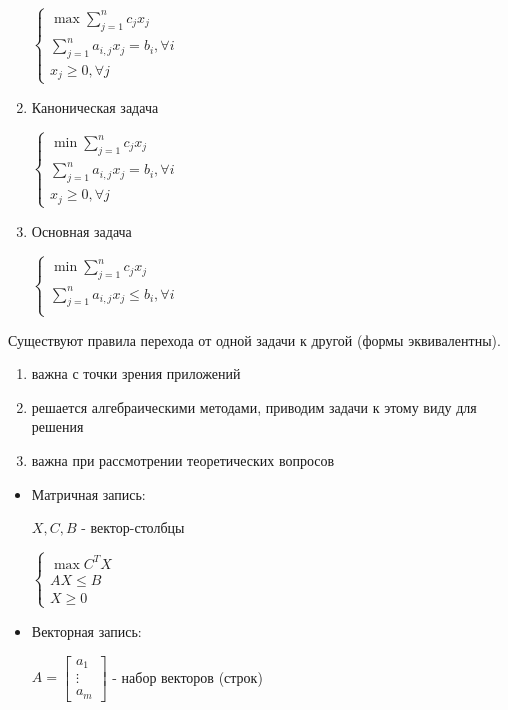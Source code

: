 \documentclass[11pt]{article}
\theoremstyle{break}
\begin{document}
\begin{sloppypar}
\begin{enumerate}
    $\begin{cases}
      \max \sum_{j = 1}^n c_j x_j \\
      \sum_{j = 1}^n a_{i, j} x_j = b_i, \forall i \\
      x_j \geq 0, \forall j
    \end{cases}$
  \item Каноническая задача
  
    $\begin{cases}
      \min \sum_{j = 1}^n c_j x_j \\
      \sum_{j = 1}^n a_{i, j} x_j = b_i, \forall i \\
      x_j \geq 0, \forall j
    \end{cases}$
  \item Основная задача
    
    $\begin{cases}
      \min \sum_{j = 1}^n c_j x_j \\
      \sum_{j = 1}^n a_{i, j} x_j \leq b_i, \forall i \\
    \end{cases}$
\end{enumerate}

Существуют правила перехода от одной задачи к другой (формы эквивалентны).
\begin{enumerate}
  \item важна с точки зрения приложений
  \item решается алгебраическими методами, приводим задачи к этому виду для решения
  \item важна при рассмотрении теоретических вопросов
\end{enumerate}

\begin{itemize}
\item Матричная запись:

 $X, C, B$ - вектор-столбцы

$\begin{cases}
  \max C^T X \\
  AX \leq B \\
  X \geq 0
\end{cases}$

\item Векторная запись:

$A = \begin{bmatrix}
  a_1 \\ \vdots \\ a_m
\end{bmatrix}$ - набор векторов (строк) 


\end{itemize}
\end{sloppypar}
\end{document}

